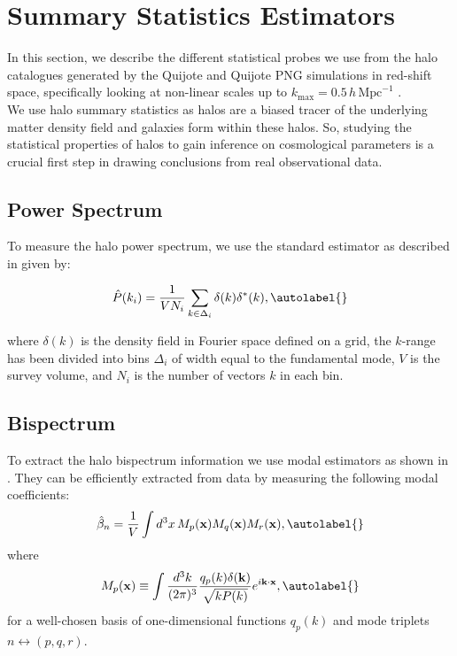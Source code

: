 \section{ Summary Statistics Estimators}

In this section, we describe the different statistical probes we use from the halo catalogues generated by the Quijote and Quijote PNG simulations in red-shift space, specifically looking at non-linear scales up to $k_{\mathrm{max}} = 0.5\,h\,\mathrm{Mpc}^{-1}$ .\\

We use halo summary statistics as halos are a biased tracer of the underlying matter density field and galaxies form within these halos. So, studying the statistical properties of halos to gain inference on cosmological parameters is a crucial first step in drawing conclusions from real observational data.


\subsection{Power Spectrum}

To measure the halo power spectrum, we use the standard estimator \cite{feldman1994ApJ...426...23F} as described in \cite{jung2024quijotepngoptimizingsummarystatistics} given by:

\begin{equation}
    \hat{P}(k_i) = \frac{1}{V N_i} \sum_{k \in \Delta_i} \delta(k) \delta^*(k),\autolabel{}
\end{equation}

where $\delta(k)$ is the density field in Fourier space defined on a grid, the $k$-range has been divided into bins $\Delta_i$ of width equal to the fundamental mode, $V$ is the survey volume, and $N_i$ is the number of vectors $k$ in each bin.

\subsection{Bispectrum}

To extract the halo bispectrum information we use modal estimators as shown in \cite{Jung_2023}. They can be efficiently extracted from data by measuring the following modal coefficients:
\begin{equation}
    \hat{\beta}_n = \frac{1}{V} \int d^3 x \, M_p(\mathbf{x}) M_q(\mathbf{x}) M_r(\mathbf{x}), \autolabel{}
\end{equation}
where
\begin{equation}
    M_p(\mathbf{x}) \equiv \int \frac{d^3 k}{(2 \pi)^3} \frac{q_p(k) \delta(\mathbf{k})}{\sqrt{k P(k)}} e^{i \mathbf{k} \cdot \mathbf{x}}, \autolabel{}
\end{equation}
for a well-chosen basis of one-dimensional functions \( q_p(k) \) and mode triplets \( n \leftrightarrow (p, q, r) \). 


